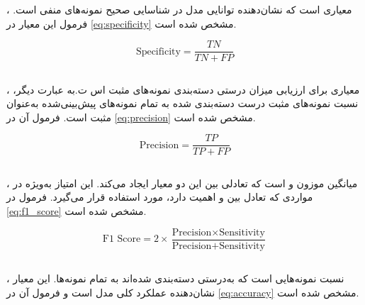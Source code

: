 ، معیاری است که نشان‌دهنده توانایی مدل در شناسایی صحیح نمونه‌های منفی است. فرمول این معیار در \autoref{eq:specificity} مشخص شده است.

\begin{latin}
\begin{equation}
\label{eq:specificity}
\text{Specificity} = \frac{TN}{TN + FP}
\end{equation}
\end{latin}

\subsection{}

، معیاری برای ارزیابی میزان درستی دسته‌بندی نمونه‌های مثبت اس ت.به عبارت دیگر،  نسبت نمونه‌های مثبت درست دسته‌بندی شده به تمام نمونه‌های پیش‌بینی‌شده به‌عنوان مثبت است. فرمول آن در \autoref{eq:precision} مشخص شده است.

\begin{latin}
\begin{equation}
\label{eq:precision}
\text{Precision} = \frac{TP}{TP + FP}
\end{equation}
\end{latin}

\subsection{}

، میانگین موزون  و  است که تعادلی بین این دو معیار ایجاد می‌کند. این امتیاز به‌ویژه در مواردی که تعادل بین  و  اهمیت دارد، مورد استفاده قرار می‌گیرد. فرمول  در \autoref{eq:f1_score} مشخص شده است.

\begin{latin}
\begin{equation}
\label{eq:f1_score}
\text{F1 Score} = 2 \times \frac{\text{Precision} \times \text{Sensitivity}}{\text{Precision} + \text{Sensitivity}}
\end{equation}
\end{latin}

\subsection{}

، نسبت نمونه‌هایی است که به‌درستی دسته‌بندی شده‌اند به تمام نمونه‌ها. این معیار نشان‌دهنده عملکرد کلی مدل است و فرمول آن در \autoref{eq:accuracy} مشخص شده است.

